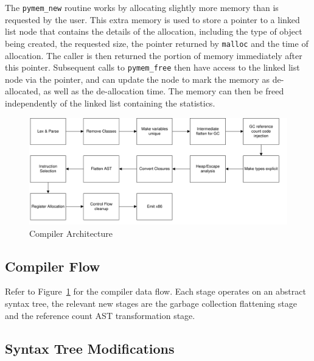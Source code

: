 \documentclass{sigplanconf}
\begin{document}
The \texttt{pymem\_new} routine works by allocating slightly more memory than is requested by the user.  This extra memory is used to store a pointer to a linked list node that contains the details of the allocation, including the type of object being created, the requested size, the pointer returned by \texttt{malloc} and the time of allocation.  The caller is then returned the portion of memory immediately after this pointer.  Subsequent calls to \texttt{pymem\_free} then have access to the linked list node via the pointer, and can update the node to mark the memory as de-allocated, as well as the de-allocation time.  The memory can then be freed independently of the linked list containing the statistics. 
\begin{figure}
\begin{center}
\includegraphics[scale=0.48]{compiler_flow.pdf}
\end{center}
\caption{Compiler Architecture}
\label{fig-comparch}
\end{figure}

\subsection{Compiler Flow}
Refer to Figure~\ref{fig-comparch} for the compiler data flow.  Each stage operates on an abstract syntax tree, the relevant new stages are the garbage collection flattening stage and the reference count AST transformation stage.

\subsection{Syntax Tree Modifications}
\end{document}
